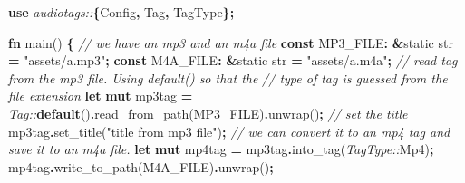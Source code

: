 \documentclass[
]{book}
\newenvironment{Shaded}{\begin{snugshade}}{\end{snugshade}}
\newcommand{\CommentTok}[1]{\textcolor[rgb]{0.56,0.35,0.01}{\textit{#1}}}
\newcommand{\DataTypeTok}[1]{\textcolor[rgb]{0.13,0.29,0.53}{#1}}
\newcommand{\KeywordTok}[1]{\textcolor[rgb]{0.13,0.29,0.53}{\textbf{#1}}}
\newcommand{\NormalTok}[1]{#1}
\newcommand{\OperatorTok}[1]{\textcolor[rgb]{0.81,0.36,0.00}{\textbf{#1}}}
\newcommand{\OtherTok}[1]{\textcolor[rgb]{0.56,0.35,0.01}{#1}}
\newcommand{\PreprocessorTok}[1]{\textcolor[rgb]{0.56,0.35,0.01}{\textit{#1}}}
\newcommand{\StringTok}[1]{\textcolor[rgb]{0.31,0.60,0.02}{#1}}
\begin{document}
\begin{Shaded}
\begin{Highlighting}[]
\KeywordTok{use} \PreprocessorTok{audiotags::}\OperatorTok{\{}\NormalTok{Config}\OperatorTok{,}\NormalTok{ Tag}\OperatorTok{,}\NormalTok{ TagType}\OperatorTok{\};}

\KeywordTok{fn}\NormalTok{ main() }\OperatorTok{\{}
    \CommentTok{// we have an mp3 and an m4a file}
    \KeywordTok{const}\NormalTok{ MP3\_FILE}\OperatorTok{:} \OperatorTok{\&}\OtherTok{\textquotesingle{}static} \DataTypeTok{str} \OperatorTok{=} \StringTok{"assets/a.mp3"}\OperatorTok{;}
    \KeywordTok{const}\NormalTok{ M4A\_FILE}\OperatorTok{:} \OperatorTok{\&}\OtherTok{\textquotesingle{}static} \DataTypeTok{str} \OperatorTok{=} \StringTok{"assets/a.m4a"}\OperatorTok{;}
    \CommentTok{// read tag from the mp3 file. Using \textasciigrave{}default()\textasciigrave{} so that the}
    \CommentTok{// type of tag is guessed from the file extension}
    \KeywordTok{let} \KeywordTok{mut}\NormalTok{ mp3tag }\OperatorTok{=} \PreprocessorTok{Tag::}\KeywordTok{default}\NormalTok{()}\OperatorTok{.}\NormalTok{read\_from\_path(MP3\_FILE)}\OperatorTok{.}\NormalTok{unwrap()}\OperatorTok{;}
    \CommentTok{// set the title}
\NormalTok{    mp3tag}\OperatorTok{.}\NormalTok{set\_title(}\StringTok{"title from mp3 file"}\NormalTok{)}\OperatorTok{;}
    \CommentTok{// we can convert it to an mp4 tag and save it to an m4a file.}
    \KeywordTok{let} \KeywordTok{mut}\NormalTok{ mp4tag }\OperatorTok{=}\NormalTok{ mp3tag}\OperatorTok{.}\NormalTok{into\_tag(}\PreprocessorTok{TagType::}\NormalTok{Mp4)}\OperatorTok{;}
\NormalTok{    mp4tag}\OperatorTok{.}\NormalTok{write\_to\_path(M4A\_FILE)}\OperatorTok{.}\NormalTok{unwrap()}\OperatorTok{;}


\end{Highlighting}
\end{Shaded}
\end{document}

